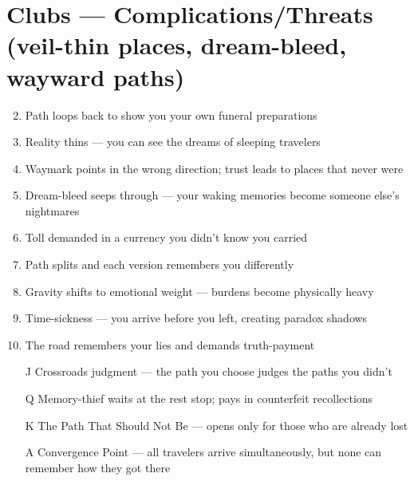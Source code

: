 \section*{Clubs --- Complications/Threats (veil-thin places, dream-bleed, wayward paths)}
\begin{enumerate}
\setcounter{enumi}{1}
\item Path loops back to show you your own funeral preparations
\item Reality thins --- you can see the dreams of sleeping travelers
\item Waymark points in the wrong direction; trust leads to places that never were
\item Dream-bleed seeps through --- your waking memories become someone else's nightmares
\item Toll demanded in a currency you didn't know you carried
\item Path splits and each version remembers you differently
\item Gravity shifts to emotional weight --- burdens become physically heavy
\item Time-sickness --- you arrive before you left, creating paradox shadows
\item The road remembers your lies and demands truth-payment
\item[J] Crossroads judgment --- the path you choose judges the paths you didn't
\item[Q] Memory-thief waits at the rest stop; pays in counterfeit recollections
\item[K] The Path That Should Not Be --- opens only for those who are already lost
\item[A] Convergence Point --- all travelers arrive simultaneously, but none can remember how they got there
\end{enumerate}

